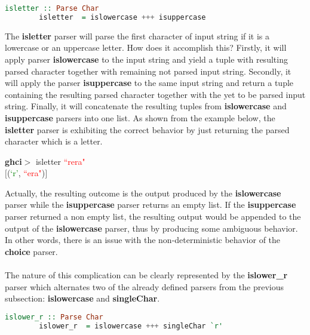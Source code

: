 \documentclass[a4paper, onecolumn]{article}
\begin{document}
    \begin{tcolorbox}
    \begin{lstlisting}[language=Haskell] 
        isletter :: Parse Char
        isletter  = islowercase +++ isuppercase
    \end{lstlisting}
    \end{tcolorbox}
    
    \noindent The \textbf{isletter} parser will parse the first character of input string if it is a lowercase or an uppercase letter. How does it accomplish this? Firstly, it will apply parser \textbf{islowercase} to the input string and yield a tuple with resulting parsed character together with remaining not parsed input string. Secondly, it will apply the parser \textbf{isuppercase} to the same input string and return a tuple containing the resulting  parsed character together with the yet to be parsed input string. Finally, it will concatenate the resulting tuples from \textbf{islowercase} and \textbf{isuppercase} parsers into one list. As shown from the example below, the \textbf{isletter} parser is exhibiting the correct behavior by just returning the parsed character which is a letter.
    
    \begin{center}
            \textbf{ghci$>$} isletter \textcolor{red}{``rera"} \\
            $\big[$(\textcolor{green}{`r'}, \textcolor{red}{``era"})$\big]$
    \end{center}
    
    \noindent Actually, the resulting outcome is the output produced by the \textbf{islowercase} parser while the \textbf{isuppercase} parser returns an empty list. If the \textbf{isuppercase} parser returned a non empty list, the resulting output would be appended to the output of the \textbf{islowercase} parser, thus by producing some ambiguous behavior. In other words, there is an issue with the non-deterministic behavior of the \textbf{choice} parser. \\ \\
    The nature of this complication can be clearly represented by the \textbf{islower\_r} parser which alternates two of the already defined parsers from the previous subsection: \textbf{islowercase} and \textbf{singleChar}. 
    
    \begin{tcolorbox}
    \begin{lstlisting}[language=Haskell] 
        islower_r :: Parse Char
        islower_r  = islowercase +++ singleChar `r'
    \end{lstlisting}
    \end{tcolorbox}
    
\end{document}
